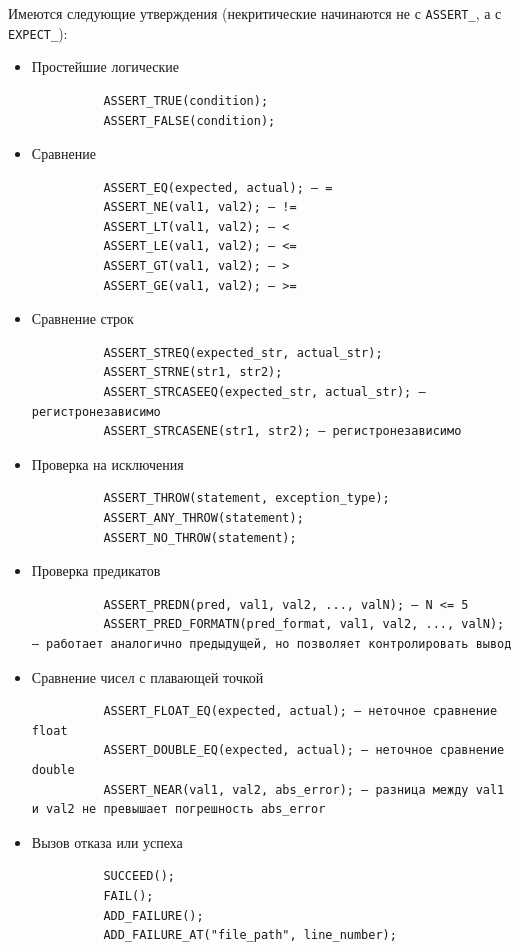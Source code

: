 \documentclass[12pt, twoside]{report}
\begin{document}
Имеются следующие утверждения (некритические начинаются не с \texttt{ASSERT\_}, а с \texttt{EXPECT\_}):

\begin{itemize}
  \item Простейшие логические
        \begin{verbatim}
          ASSERT_TRUE(condition);
          ASSERT_FALSE(condition);
        \end{verbatim}

  \item Сравнение
        \begin{verbatim}
          ASSERT_EQ(expected, actual); — =
          ASSERT_NE(val1, val2); — !=
          ASSERT_LT(val1, val2); — <
          ASSERT_LE(val1, val2); — <=
          ASSERT_GT(val1, val2); — >
          ASSERT_GE(val1, val2); — >=
        \end{verbatim}

  \item Сравнение строк
        \begin{verbatim}
          ASSERT_STREQ(expected_str, actual_str);
          ASSERT_STRNE(str1, str2);
          ASSERT_STRCASEEQ(expected_str, actual_str); — регистронезависимо
          ASSERT_STRCASENE(str1, str2); — регистронезависимо
        \end{verbatim}

  \item Проверка на исключения
        \begin{verbatim}
          ASSERT_THROW(statement, exception_type);
          ASSERT_ANY_THROW(statement);
          ASSERT_NO_THROW(statement);
        \end{verbatim}

  \item Проверка предикатов
        \begin{verbatim}
          ASSERT_PREDN(pred, val1, val2, ..., valN); — N <= 5
          ASSERT_PRED_FORMATN(pred_format, val1, val2, ..., valN); — работает аналогично предыдущей, но позволяет контролировать вывод
        \end{verbatim}

  \item Сравнение чисел с плавающей точкой
        \begin{verbatim}
          ASSERT_FLOAT_EQ(expected, actual); — неточное сравнение float
          ASSERT_DOUBLE_EQ(expected, actual); — неточное сравнение double
          ASSERT_NEAR(val1, val2, abs_error); — разница между val1 и val2 не превышает погрешность abs_error
        \end{verbatim}

  \item Вызов отказа или успеха
        \begin{verbatim}
          SUCCEED();
          FAIL();
          ADD_FAILURE();
          ADD_FAILURE_AT("file_path", line_number);
        \end{verbatim}
\end{itemize}
\end{document}

